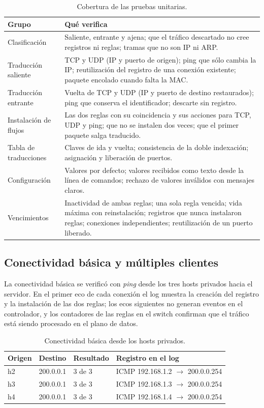 ﻿\documentclass[10pt,a4paper]{article}
\begin{document}
\begin{table}[H]
\centering
\small
\begin{tabular}{p{}p{}}
\toprule
\textbf{Grupo} & \textbf{Qué verifica} \\
\midrule
Clasificación & Saliente, entrante y ajena; que el tráfico descartado no cree registros
ni reglas; tramas que no son IP ni ARP. \\
Traducción saliente & TCP y UDP (IP y puerto de origen); ping que sólo cambia la IP;
reutilización del registro de una conexión existente; paquete encolado cuando falta la
MAC. \\
Traducción entrante & Vuelta de TCP y UDP (IP y puerto de destino restaurados); ping
que conserva el identificador; descarte sin registro. \\
Instalación de flujos & Las dos reglas con su coincidencia y sus acciones para TCP,
UDP y ping; que no se instalen dos veces; que el primer paquete salga traducido. \\
Tabla de traducciones & Claves de ida y vuelta; consistencia de la doble indexación;
asignación y liberación de puertos. \\
Configuración & Valores por defecto; valores recibidos como texto desde la línea de
comandos; rechazo de valores inválidos con mensajes claros. \\
Vencimientos & Inactividad de ambas reglas; una sola regla vencida; vida máxima con
reinstalación; registros que nunca instalaron reglas; conexiones independientes;
reutilización de un puerto liberado. \\
\bottomrule
\end{tabular}
\caption{Cobertura de las pruebas unitarias.}
\label{tab:tests}
\end{table}

\subsection{Conectividad básica y múltiples clientes}

La conectividad básica se verificó con \emph{ping} desde los tres hosts privados
hacia el servidor. En el primer eco de cada conexión el log muestra la creación del
registro y la instalación de las dos reglas; los ecos siguientes no generan eventos
en el controlador, y los contadores de las reglas en el switch confirman que el
tráfico está siendo procesado en el plano de datos.

\begin{table}[H]
\centering
\begin{tabular}{llll}
\toprule
\textbf{Origen} & \textbf{Destino} & \textbf{Resultado} & \textbf{Registro en el log} \\
\midrule
h2 & 200.0.0.1 & 3 de 3 & ICMP 192.168.1.2 $\rightarrow$ 200.0.0.254 \\
h3 & 200.0.0.1 & 3 de 3 & ICMP 192.168.1.3 $\rightarrow$ 200.0.0.254 \\
h4 & 200.0.0.1 & 3 de 3 & ICMP 192.168.1.4 $\rightarrow$ 200.0.0.254 \\
\bottomrule
\end{tabular}
\caption{Conectividad básica desde los hosts privados.}
\label{tab:ping}
\end{table}
\end{document}
